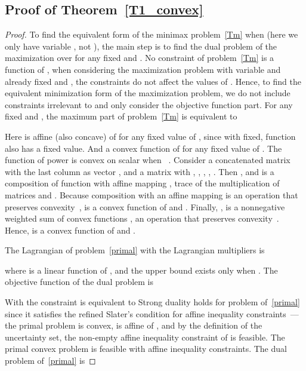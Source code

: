 \documentclass[10pt,twocolumn,twoside,english]{IEEEtran}
\begin{document}
\subsection{Proof of Theorem~\ref{T1_convex}}
\label{appendix_T1}
\begin{proof}To find the equivalent form of the minimax problem~\eqref{Tm} when  (here we only have variable , not ), the main step is to find the dual problem of the maximization over  for any fixed  and . No constraint of problem~\eqref{Tm} is a function of , when considering the maximization problem with variable  and already fixed  and , the constraints do not affect the values of . Hence, to find the equivalent minimization form of the maximization problem, we do not include constraints irrelevant to  and only consider the objective function part. For any fixed  and , the maximum part of problem~\eqref{Tm} is equivalent to



Here  is affine (also concave) of  for any fixed value of , since with  fixed, function  also has a fixed value. And  a convex function of  for any fixed value of . The function of power  is convex on scalar  when ~\cite[Chapter 3.1.5]{book_convex}. Consider a concatenated matrix  with the last column as vector , and a matrix  with , , , , . Then ,  and  is a composition of function  with affine mapping , trace of the multiplication of matrices  and . Because composition with an affine mapping is an operation that preserves convexity~\cite[Chapter 3.2.2]{book_convex},  is a convex function of  and . Finally, ,  is a nonnegative weighted sum of convex functions , an operation that preserves convexity~\cite[Chapter 3.2.1]{book_convex}. Hence,  is a convex function of  and . 

The Lagrangian of problem~\eqref{primal} with the Lagrangian multipliers  is

where  is a linear function of , and the upper bound exists only when .
The objective function of the dual problem is

With  the constraint  is equivalent to  Strong duality holds for problem of~\eqref{primal} since it satisfies the refined Slater's condition for affine inequality constraints~\cite[Chapter 5.2.3]{book_convex}---the primal problem is convex,  is affine of , and by the definition of the uncertainty set, the non-empty affine inequality constraint of  is feasible. The primal convex problem is feasible with affine inequality constraints. The dual problem of~\eqref{primal} is



\end{proof}
\end{document}
